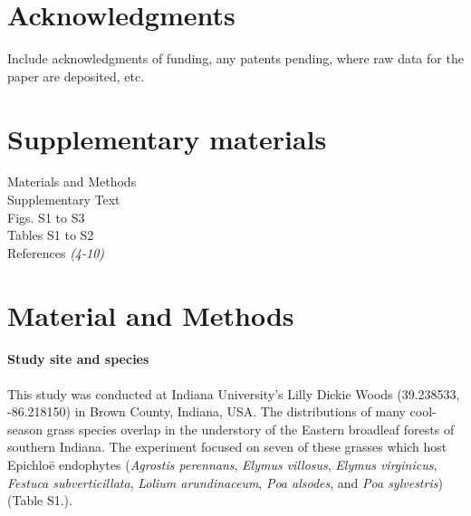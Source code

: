 \documentclass[12pt]{article}
\begin{document}








\section*{Acknowledgments}
Include acknowledgments of funding, any patents pending, where raw data for the paper are deposited, etc.

\section*{Supplementary materials}
Materials and Methods\\
Supplementary Text\\


Figs. S1 to S3\\
Tables S1 to S2\\
References \textit{(4-10)}


\section*{Material and Methods}
\paragraph*{Study site and species}
This study was conducted at Indiana University's Lilly Dickie Woods (39.238533, -86.218150) in Brown County, Indiana, USA. 
The distributions of many cool-season grass species overlap in the understory of the Eastern broadleaf forests of southern Indiana. 
The experiment focused on seven of these grasses which host Epichlo\"e endophytes (\emph{Agrostis perennans}, \emph{Elymus villosus}, \emph{Elymus virginicus}, \emph{Festuca subverticillata}, \emph{Lolium arundinaceum}, \emph{Poa alsodes}, and \emph{Poa sylvestris}) (Table S1.). 
\end{document}
